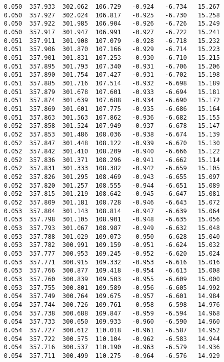 \begin{verbatim}
   0.050  357.933  302.062  106.729   -0.924   -6.734   15.267
   0.050  357.927  302.024  106.817   -0.925   -6.730   15.258
   0.050  357.922  301.985  106.904   -0.926   -6.726   15.249
   0.050  357.917  301.947  106.991   -0.927   -6.722   15.241
   0.051  357.911  301.908  107.079   -0.928   -6.718   15.232
   0.051  357.906  301.870  107.166   -0.929   -6.714   15.223
   0.051  357.901  301.831  107.253   -0.930   -6.710   15.215
   0.051  357.895  301.793  107.340   -0.931   -6.706   15.206
   0.051  357.890  301.754  107.427   -0.931   -6.702   15.198
   0.051  357.885  301.716  107.514   -0.932   -6.698   15.189
   0.051  357.879  301.678  107.601   -0.933   -6.694   15.181
   0.051  357.874  301.639  107.688   -0.934   -6.690   15.172
   0.051  357.869  301.601  107.775   -0.935   -6.686   15.164
   0.051  357.863  301.563  107.862   -0.936   -6.682   15.155
   0.052  357.858  301.524  107.949   -0.937   -6.678   15.147
   0.052  357.853  301.486  108.036   -0.938   -6.674   15.139
   0.052  357.847  301.448  108.122   -0.939   -6.670   15.130
   0.052  357.842  301.410  108.209   -0.940   -6.666   15.122
   0.052  357.836  301.371  108.296   -0.941   -6.662   15.114
   0.052  357.831  301.333  108.382   -0.942   -6.659   15.105
   0.052  357.826  301.295  108.469   -0.943   -6.655   15.097
   0.052  357.820  301.257  108.555   -0.944   -6.651   15.089
   0.052  357.815  301.219  108.642   -0.945   -6.647   15.081
   0.052  357.809  301.181  108.728   -0.946   -6.643   15.072
   0.053  357.804  301.143  108.814   -0.947   -6.639   15.064
   0.053  357.798  301.105  108.901   -0.948   -6.635   15.056
   0.053  357.793  301.067  108.987   -0.949   -6.632   15.048
   0.053  357.788  301.029  109.073   -0.950   -6.628   15.040
   0.053  357.782  300.991  109.159   -0.951   -6.624   15.032
   0.053  357.777  300.953  109.245   -0.952   -6.620   15.024
   0.053  357.771  300.915  109.332   -0.953   -6.616   15.016
   0.053  357.766  300.877  109.418   -0.954   -6.613   15.008
   0.053  357.760  300.839  109.503   -0.955   -6.609   15.000
   0.053  357.755  300.801  109.589   -0.956   -6.605   14.992
   0.054  357.749  300.764  109.675   -0.957   -6.601   14.984
   0.054  357.744  300.726  109.761   -0.958   -6.598   14.976
   0.054  357.738  300.688  109.847   -0.959   -6.594   14.968
   0.054  357.733  300.650  109.933   -0.960   -6.590   14.960
   0.054  357.727  300.612  110.018   -0.961   -6.587   14.952
   0.054  357.722  300.575  110.104   -0.962   -6.583   14.944
   0.054  357.716  300.537  110.190   -0.963   -6.579   14.936
   0.054  357.711  300.499  110.275   -0.964   -6.576   14.929

\end{verbatim}
